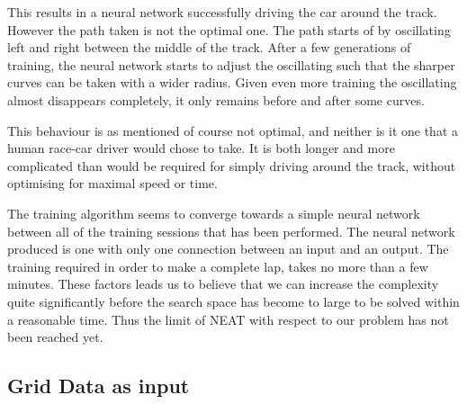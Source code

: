 This results in a neural network successfully driving the car around the track. However the path taken is not the optimal one. The path starts of by oscillating left and right between the middle of the track. After a few generations of training, the neural network starts to adjust the oscillating such that the sharper curves can be taken with a wider radius. Given even more training the oscillating almost disappears completely, it only remains before and after some curves.

This behaviour is as mentioned of course not optimal, and neither is it one that a human race-car driver would chose to take. It is both longer and more complicated than would be required for simply driving around the track, without optimising for maximal speed or time.

The training algorithm seems to converge towards a simple neural network between all of the training sessions that has been performed. The neural network produced is one with only one connection between an input and an output. The training required in order to make a complete lap, takes no more than a few minutes. These factors leads us to believe that we can increase the complexity quite significantly before the search space has become to large to be solved within a reasonable time. Thus the limit of NEAT with respect to our problem has not been reached yet.


\subsection{Grid Data as input}

\iffalse

====== OLD COMMENTS =====
 
General structure for the results of an experiment:
- Shortly describe the experiment and reference to the description in Method
- Result data (See below)
- Stages in the learning development
  - Did it get stuck at some point?
- What the behaviour became
  - Description
  - Image with interesting racing lines
- Analyse
- Compare to other experiments (if feasible)

Result data:
- Training time
 - Number of generations etc.
 - Number of evaluations
- Fitness
- Analysis of behaviour, may be of different aspects
- Settings variables
- Topology of network
 - measurements of different kinds?

\fi
\fi